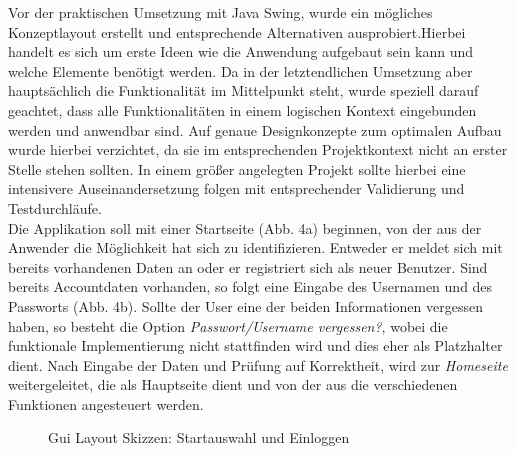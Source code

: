 \documentclass[a4paper]{article}
\begin{document}
Vor der praktischen Umsetzung mit Java Swing, wurde ein mögliches Konzeptlayout erstellt und entsprechende Alternativen ausprobiert.Hierbei handelt es sich um erste Ideen wie die Anwendung aufgebaut sein kann und welche Elemente benötigt werden.
Da in der letztendlichen Umsetzung aber hauptsächlich die Funktionalität im Mittelpunkt steht, wurde speziell darauf geachtet, dass alle Funktionalitäten in einem logischen Kontext eingebunden werden und anwendbar sind. Auf genaue Designkonzepte zum optimalen Aufbau wurde hierbei verzichtet, da sie im entsprechenden Projektkontext nicht an erster Stelle stehen sollten. In einem größer angelegten Projekt sollte hierbei eine intensivere Auseinandersetzung folgen mit entsprechender Validierung und Testdurchläufe. \\

Die Applikation soll mit einer Startseite (Abb. 4a) beginnen, von der aus der Anwender die Möglichkeit hat sich zu identifizieren. Entweder er meldet sich mit bereits vorhandenen Daten an oder er registriert sich als neuer Benutzer.
Sind bereits Accountdaten vorhanden, so folgt eine Eingabe des Usernamen und des Passworts (Abb. 4b). Sollte der User eine der beiden Informationen vergessen haben, so besteht die Option \textit{Passwort/Username vergessen?}, wobei die funktionale Implementierung nicht stattfinden wird und dies eher als Platzhalter dient. Nach Eingabe der Daten und Prüfung auf Korrektheit, wird zur \textit{Homeseite} weitergeleitet, die als Hauptseite dient und von der aus die verschiedenen Funktionen angesteuert werden.

\begin{figure}[h!]
\centering
\hfill %
\hfill %
\hfill %
\caption{Gui Layout Skizzen: Startauswahl und Einloggen }
\label{Gui}
\end{figure}
\end{document}
